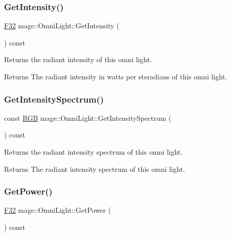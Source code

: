 \subsubsection{\texorpdfstring{Get\+Intensity()}{GetIntensity()}}
{\footnotesize\ttfamily \hyperlink{namespacemage_aa97e833b45f06d60a0a9c4fc22ae02c0}{F32} mage\+::\+Omni\+Light\+::\+Get\+Intensity (\begin{DoxyParamCaption}{ }\end{DoxyParamCaption}) const\hspace{0.3cm}{\ttfamily [noexcept]}}

Returns the radiant intensity of this omni light.

\begin{DoxyReturn}{Returns}
The radiant intensity in watts per steradians of this omni light. 
\end{DoxyReturn}
\hypertarget{classmage_1_1_omni_light_a89ce7086bd33e1d419dbd755316daf2e}{}\label{classmage_1_1_omni_light_a89ce7086bd33e1d419dbd755316daf2e} 
\subsubsection{\texorpdfstring{Get\+Intensity\+Spectrum()}{GetIntensitySpectrum()}}
{\footnotesize\ttfamily const \hyperlink{structmage_1_1_r_g_b}{R\+GB} mage\+::\+Omni\+Light\+::\+Get\+Intensity\+Spectrum (\begin{DoxyParamCaption}{ }\end{DoxyParamCaption}) const\hspace{0.3cm}{\ttfamily [noexcept]}}

Returns the radiant intensity spectrum of this omni light.

\begin{DoxyReturn}{Returns}
The radiant intensity spectrum of this omni light. 
\end{DoxyReturn}
\hypertarget{classmage_1_1_omni_light_a13f9893ef0a19cbb08bfce557bb906fc}{}\label{classmage_1_1_omni_light_a13f9893ef0a19cbb08bfce557bb906fc} 
\subsubsection{\texorpdfstring{Get\+Power()}{GetPower()}}
{\footnotesize\ttfamily \hyperlink{namespacemage_aa97e833b45f06d60a0a9c4fc22ae02c0}{F32} mage\+::\+Omni\+Light\+::\+Get\+Power (\begin{DoxyParamCaption}{ }\end{DoxyParamCaption}) const\hspace{0.3cm}{\ttfamily [noexcept]}}

